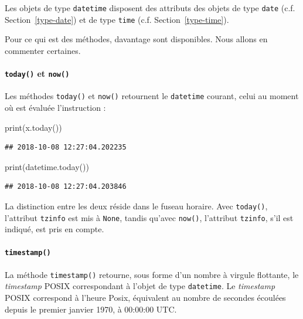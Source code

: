 \documentclass[12pt,]{book}
\newenvironment{Shaded}{\begin{snugshade}}{\end{snugshade}}
\newcommand{\BuiltInTok}[1]{#1}
\newcommand{\NormalTok}[1]{#1}
\let\oldparagraph\paragraph
\renewcommand{\paragraph}[1]{\oldparagraph{#1}\mbox{}}
\numberwithin{equation}{section}
\numberwithin{countremarque}{section}
\begin{document}
Les objets de type \texttt{datetime} disposent des attributs des objets
de type \texttt{date} (c.f. Section~\ref{type-date}) et de type
\texttt{time} (c.f. Section~\ref{type-time}).

Pour ce qui est des méthodes, davantage sont disponibles. Nous allons en
commenter certaines.

\paragraph{\texorpdfstring{\texttt{today()} et
\texttt{now()}}{today() et now()}}\label{today-et-now}

Les méthodes \texttt{today()} et \texttt{now()} retournent le
\texttt{datetime} courant, celui au moment où est évaluée l'instruction
:

\begin{Shaded}
\begin{Highlighting}[]
\BuiltInTok{print}\NormalTok{(x.today())}
\end{Highlighting}
\end{Shaded}

\begin{lstlisting}
## 2018-10-08 12:27:04.202235
\end{lstlisting}

\begin{Shaded}
\begin{Highlighting}[]
\BuiltInTok{print}\NormalTok{(datetime.today())}
\end{Highlighting}
\end{Shaded}

\begin{lstlisting}
## 2018-10-08 12:27:04.203846
\end{lstlisting}

La distinction entre les deux réside dans le fuseau horaire. Avec
\texttt{today()}, l'attribut \texttt{tzinfo} est mis à \texttt{None},
tandis qu'avec \texttt{now()}, l'attribut \texttt{tzinfo}, s'il est
indiqué, est pris en compte.

\paragraph{\texorpdfstring{\texttt{timestamp()}}{timestamp()}}\label{timestamp}

La méthode \texttt{timestamp()} retourne, sous forme d'un nombre à
virgule flottante, le \emph{timestamp} POSIX correspondant à l'objet de
type \texttt{datetime}. Le \emph{timestamp} POSIX correspond à l'heure
Posix, équivalent au nombre de secondes écoulées depuis le premier
janvier 1970, à 00:00:00 UTC.
\end{document}
